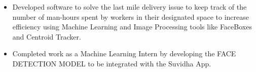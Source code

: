 \documentclass[10pt,a4paper,ragged2e]{altacv}
\begin{document}

\begin{fullwidth}
\makecvheader
\end{fullwidth}



\begin{itemize}
    \item Developed software to solve the last mile delivery issue to keep track of the number of man-hours spent by workers in their designated space to increase efficiency using Machine Learning and Image \newline Processing tools like FaceBoxes and Centroid Tracker.
    \end{itemize}
    \divider\newline
{}
\begin{itemize}
    \item Completed work as a Machine Learning Intern by developing the FACE DETECTION MODEL to be integrated with the Suvidha App.
\end{itemize}
\end{document}
